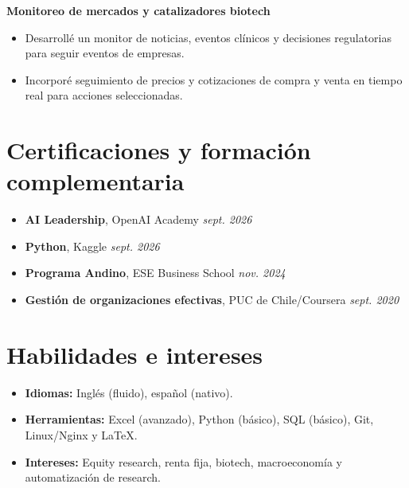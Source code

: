 \documentclass[10pt,letterpaper]{article}
\begin{document}
\vspace{2pt}
\textbf{Monitoreo de mercados y catalizadores biotech}
\begin{itemize}
	\item Desarrollé un monitor de noticias, eventos clínicos y decisiones regulatorias
		para seguir eventos de empresas.
	\item Incorporé seguimiento de precios y cotizaciones de compra y venta en
		tiempo real para acciones seleccionadas.
\end{itemize}

\section{Certificaciones y formación complementaria}
\begin{itemize}
	\item \textbf{AI Leadership}, OpenAI Academy \hfill \textit{sept. 2026}
	\item \textbf{Python}, Kaggle \hfill \textit{sept. 2026}
	\item \textbf{Programa Andino}, ESE Business School \hfill \textit{nov. 2024}
	\item \textbf{Gestión de organizaciones efectivas}, PUC de Chile/Coursera \hfill
		\textit{sept. 2020}
\end{itemize}

\section{Habilidades e intereses}
\begin{itemize}
	\item \textbf{Idiomas:} Inglés (fluido), español (nativo).
	\item \textbf{Herramientas:} Excel (avanzado), 
		Python (básico), SQL (básico), Git, Linux/Nginx y \LaTeX.
	\item \textbf{Intereses:} Equity research, renta fija, biotech,
		macroeconomía y automatización de research.
\end{itemize}
\end{document}
